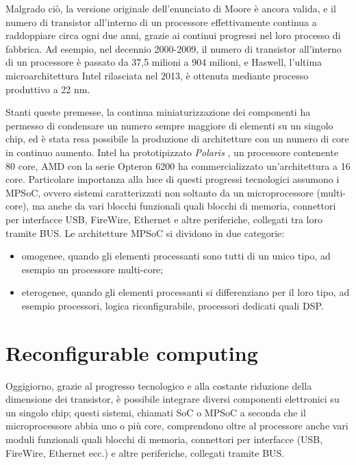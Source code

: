 Malgrado ci\`o, la versione originale dell'enunciato di Moore \`e ancora valida, e il numero di transistor
all'interno di un processore effettivamente continua a raddoppiare circa ogni due anni, grazie ai continui progressi
nel loro processo di fabbrica. Ad esempio, nel decennio 2000-2009, il numero di transistor all'interno di
un processore \`e passato da 37,5 milioni a 904 milioni, e Haswell, l'ultima microarchitettura Intel
rilasciata nel 2013, \`e ottenuta mediante processo produttivo a 22 nm.

Stanti queste premesse, la continua miniaturizzazione dei componenti ha permesso di condensare
un numero sempre maggiore di elementi su un singolo chip, ed \`e stata resa possibile la produzione di
architetture con un numero di core in continuo aumento. Intel ha prototipizzato \emph{Polaris} \cite{IntelPolaris},
un processore contenente 80 core, AMD con la serie Opteron\texttrademark{} 6200 ha commercializzato
un'architettura a 16 core.
Particolare importanza alla luce di questi progressi tecnologici assumono i \ac{MPSoC}, ovvero sistemi
caratterizzati non soltanto da un microprocessore (multi-core), ma anche da vari blocchi funzionali quali
blocchi di memoria, connettori per interfacce USB, FireWire, Ethernet e altre periferiche, collegati
tra loro tramite BUS. Le architetture \ac{MPSoC} si dividono in due categorie:
\begin{itemize}
  \item omogenee, quando gli elementi processanti sono tutti di un unico tipo, ad esempio un processore
    multi-core;
  \item eterogenee, quando gli elementi processanti si differenziano per il loro tipo, ad esempio processori,
    logica riconfigurabile, processori dedicati quali \ac{DSP}.
\end{itemize}
 



\section{Reconfigurable computing}
\label{sec:reconfComp}
Oggigiorno, grazie al progresso tecnologico e alla costante riduzione della dimensione 
dei transistor, è possibile integrare diversi componenti elettronici su un singolo chip; 
questi sistemi, chiamati \ac{SoC} \cite{SoCBook} o \ac{MPSoC} \cite{MPSoCBook} a seconda
che il microprocessore abbia  uno o più core, comprendono oltre al processore anche vari
moduli funzionali quali blocchi di memoria, connettori per interfacce (USB, FireWire,
Ethernet ecc.) e altre periferiche, collegati tramite BUS.

